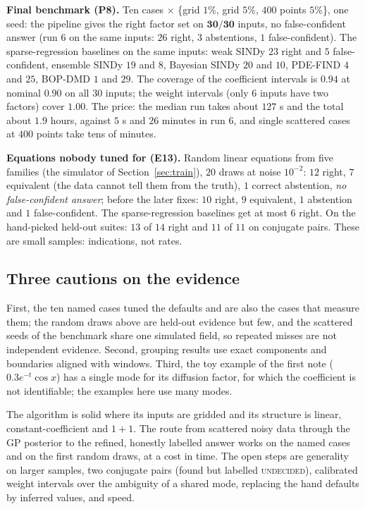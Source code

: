 \textbf{Final benchmark (P8).} Ten cases $\times$ \{grid $1\%$, grid $5\%$, $400$ points $5\%$\}, one seed: the pipeline gives the right factor set on $\mathbf{30/30}$ inputs, no false-confident answer (run 6 on the same inputs: $26$ right, $3$ abstentions, $1$ false-confident). The sparse-regression baselines on the same inputs: weak SINDy $23$ right and $5$ false-confident, ensemble SINDy $19$ and $8$, Bayesian SINDy $20$ and $10$, PDE-FIND $4$ and $25$, BOP-DMD $1$ and $29$. The coverage of the coefficient intervals is $0.94$ at nominal $0.90$ on all $30$ inputs; the weight intervals (only $6$ inputs have two factors) cover $1.00$. The price: the median run takes about $127$ s and the total about $1.9$ hours, against $5$ s and $26$ minutes in run 6, and single scattered cases at $400$ points take tens of minutes.

\textbf{Equations nobody tuned for (E13).} Random linear equations from five families (the simulator of Section~\ref{sec:train}), $20$ draws at noise $10^{-2}$: $12$ right, $7$ equivalent (the data cannot tell them from the truth), $1$ correct abstention, \emph{no false-confident answer}; before the later fixes: $10$ right, $9$ equivalent, $1$ abstention and $1$ false-confident. The sparse-regression baselines get at most $6$ right. On the hand-picked held-out suites: $13$ of $14$ right and $11$ of $11$ on conjugate pairs. These are small samples: indications, not rates.

\subsection{Three cautions on the evidence}
First, the ten named cases tuned the defaults and are also the cases that measure them; the random draws above are held-out evidence but few, and the scattered seeds of the benchmark share one simulated field, so repeated misses are not independent evidence. Second, grouping results use exact components and boundaries aligned with windows. Third, the toy example of the first note ($0.3e^{-t}\cos x$) has a single mode for its diffusion factor, for which the coefficient is not identifiable; the examples here use many modes.

\begin{keypoint}
The algorithm is solid where its inputs are gridded and its structure is linear, constant-coefficient and $1+1$. The route from scattered noisy data through the GP posterior to the refined, honestly labelled answer works on the named cases and on the first random draws, at a cost in time. The open steps are generality on larger samples, two conjugate pairs (found but labelled \textsc{undecided}), calibrated weight intervals over the ambiguity of a shared mode, replacing the hand defaults by inferred values, and speed.
\end{keypoint}
